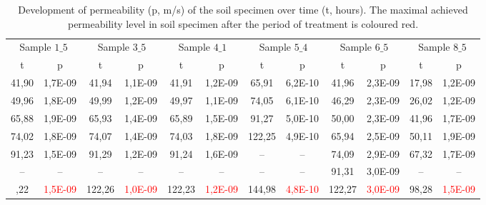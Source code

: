 \documentclass[algorithms,article,submit,pdftex,moreauthors]{Definitions/mdpi}
\begin{document}
\begin{table}[H] 
\caption{Development of permeability (p, m/s) of the soil specimen over time (t, hours). The maximal achieved permeability level in soil specimen after the period of treatment is coloured red.\label{tab06}}
\renewcommand{\arraystretch}{1.1}
\begin{adjustbox}{width=1\textwidth}
\begin{tabular}{cc|cc|cc|cc|cc|cc}
\toprule
\multicolumn{2}{c}{Sample $1\_5$} & \multicolumn{2}{c}{Sample $3\_5$} & \multicolumn{2}{c}{Sample $4\_1$} & \multicolumn{2}{c}{Sample $5\_4$} & \multicolumn{2}{c}{Sample $6\_5$} & \multicolumn{2}{c}{Sample $8\_5$}\\
\cmidrule(lr){1-2}\cmidrule(lr){3-4}\cmidrule(lr){5-6}\cmidrule(lr){7-8}\cmidrule(lr){9-10}\cmidrule(lr){11-12}
t & p & t & p & t & p & t & p & t & p & t & p\\
\midrule
41,90 &1,7E-09 & 41,94 &1,1E-09 & 41,91 & 1,2E-09 & 65,91 & 6,2E-10 & 41,96 & 2,3E-09 & 17,98 & 1,2E-09 \\
49,96 &1,8E-09 & 49,99 &1,2E-09 & 49,97 & 1,1E-09 & 74,05 & 6,1E-10 & 46,29 & 2,3E-09 & 26,02 & 1,2E-09 \\
65,88 &1,9E-09 & 65,93 &1,4E-09 & 65,89 & 1,5E-09 & 91,27 & 5,0E-10 & 50,00 & 2,3E-09 & 41,96 & 1,7E-09 \\
74,02 &1,8E-09 & 74,07 &1,4E-09 & 74,03 & 1,8E-09 & 122,25 & 4,9E-10 & 65,94 & 2,5E-09 & 50,11 & 1,9E-09 \\
91,23 &1,5E-09 & 91,29 &1,2E-09 & 91,24 & 1,6E-09 & -- &-- & 74,09 & 2,9E-09 & 67,32 & 1,7E-09 \\
-- &-- & -- & -- & -- & -- & -- &-- & 91,31 & 3,0E-09 & -- & --\\ \addlinespace
\hline
122,22 & \textcolor{red}{1,5E-09} & 122,26 &\textcolor{red}{1,0E-09} &122,23 & \textcolor{red}{1,2E-09} & 144,98 & \textcolor{red}{4,8E-10} & 122,27 & \textcolor{red}{3,0E-09} & 98,28 & \textcolor{red}{1,5E-09}\\
\bottomrule
\end{tabular}
\end{adjustbox}
\end{table}
\end{document}
